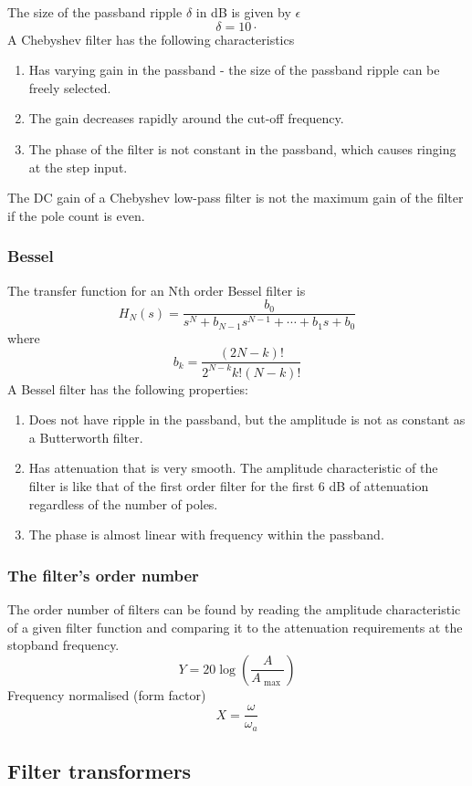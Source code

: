 The size of the passband ripple $\delta$ in dB is given by $\epsilon$
$$\delta=10\cdot $$
A Chebyshev filter has the following characteristics 
\begin{enumerate}
  \item Has varying gain in the passband - the size of the passband ripple can be freely selected. 
  \item The gain decreases rapidly around the cut-off frequency. 
  \item The phase of the filter is not constant in the passband, which causes ringing at the step input.
\end{enumerate}
The DC gain of a Chebyshev low-pass filter is not the maximum gain of the filter if the pole count is even.

\subsubsection{Bessel}
The transfer function for an Nth order Bessel filter is
$$H_{N}(s)=\frac{b_{0}}{s^N+b_{N-1} s^{N-1}+\cdots +b_{1}s+b_{0}} $$
where
$$b_{k}=\frac{(2N-k)!}{2^{N-k}k!(N-k)!}$$
A Bessel filter has the following properties:
\begin{enumerate}
  \item Does not have ripple in the passband, but the amplitude is not as constant as a Butterworth filter. 
  \item Has attenuation that is very smooth. The amplitude characteristic of the filter is like that of the first order filter for the first 6 dB of attenuation regardless of the number of poles. 
  \item The phase is almost linear with frequency within the passband.
\end{enumerate}

\subsubsection{The filter's order number}
The order number of filters can be found by reading the amplitude characteristic of a given filter function and comparing it to the attenuation requirements at the stopband frequency. 
$$Y=20\log\left( \frac{A}{A_{\text{ max }}} \right)$$
Frequency normalised (form factor)
$$X=\frac{\omega}{\omega_{a}}$$


\subsection{Filter transformers}
